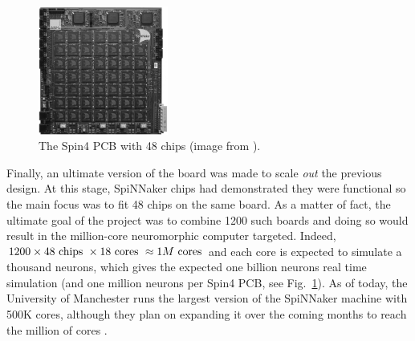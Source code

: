 \begin{figure}
  \begin{center}
    \includegraphics[width=0.38\textwidth]{figures/spin4.png}
  \end{center}
  \caption{The Spin4 PCB with 48 chips (image from \cite{bic}).}
  \label{fig:spin4}
\end{figure}

Finally, an ultimate version of the board was made to scale \textit{out} the previous design. At this stage, SpiNNaker chips had demonstrated they were functional so the main focus was to fit 48 chips on the same board. As a matter of fact, the ultimate goal of the project was to combine 1200 such boards and doing so would result in the million-core neuromorphic computer targeted. Indeed, $1200 \times 48 \textnormal{ chips } \times  18 \textnormal{ cores } \approx 1M \textnormal{ cores}$ and each core is expected to simulate a thousand neurons, which gives the expected one billion neurons real time simulation (and one million neurons per Spin4 PCB, see Fig.~\ref{fig:spin4}). As of today, the University of Manchester runs the largest version of the SpiNNaker machine with 500K cores, although they plan on expanding it over the coming months to reach the million of cores \cite{act-project-access}. \\ %
 
